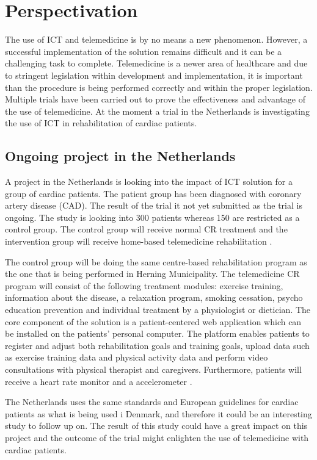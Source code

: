 \chapter{Perspectivation}

The use of ICT and telemedicine is by no means a new phenomenon. However, a successful implementation of the solution remains difficult and it can be a challenging task to complete. Telemedicine is a newer area of healthcare and due to stringent legislation within development and implementation, it is important than the procedure is being performed correctly and within the proper legislation. Multiple trials have been carried out to prove the effectiveness and advantage of the use of telemedicine. At the moment a trial in the Netherlands is investigating the use of ICT in rehabilitation of cardiac patients. 

\section{Ongoing project in the Netherlands}

A project in the Netherlands is looking into the impact of ICT solution for a group of cardiac patients. The patient group has been diagnosed with coronary artery disease (CAD). The result of the trial it not yet submitted as the trial is ongoing. The study is looking into 300 patients whereas 150 are restricted as a control group. The control group will receive normal CR treatment and the intervention group will receive home-based telemedicine rehabilitation \cite{CAD}. 

 The control group will be doing the same centre-based rehabilitation program as the one that is being performed in Herning Municipality. The telemedicine CR program will consist of the following treatment modules: exercise training, information about the disease, a relaxation program, smoking cessation, psycho education prevention and individual treatment by a physiologist or dietician. The core component of the solution is a patient-centered web application which can be installed on the patients’ personal computer. The platform enables patients to register and adjust both rehabilitation goals and training goals, upload data such as exercise training data and physical activity data and perform video consultations with physical therapist and caregivers. Furthermore, patients will receive a heart rate monitor and a accelerometer \cite{CAD}.     
 
 The Netherlands uses the same standards and European guidelines for cardiac patients as what is being used i Denmark, and therefore it could be an interesting study to follow up on. The result of this study could have a great impact on this project and the outcome of the trial might enlighten the use of telemedicine with cardiac patients. 

